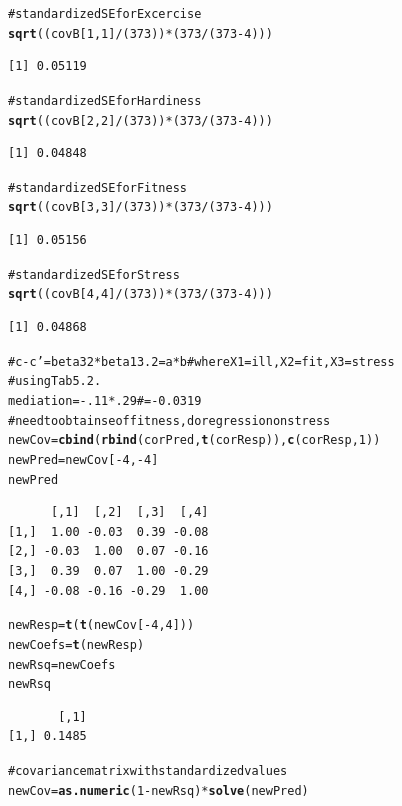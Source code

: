 \documentclass{article}\usepackage{graphicx, color}
\makeatletter
\newcommand{\hlfunctioncall}[1]{\textcolor[rgb]{0.501960784313725,0,0.329411764705882}{\textbf{#1}}}%
\newcommand{\hlcomment}[1]{\textcolor[rgb]{0.180392156862745,0.6,0.341176470588235}{#1}}%
\newenvironment{kframe}{%
 \def\at@end@of@kframe{}%
 \ifinner\ifhmode%
  \def\at@end@of@kframe{\end{minipage}}%
  \begin{minipage}{\columnwidth}%
 \fi\fi%
 \def\FrameCommand##1{\hskip\@totalleftmargin \hskip-\fboxsep
 \colorbox{shadecolor}{##1}\hskip-\fboxsep
     \hskip-\linewidth \hskip-\@totalleftmargin \hskip\columnwidth}%
 \MakeFramed {\advance\hsize-\width
   \@totalleftmargin\z@ \linewidth\hsize
   \@setminipage}}%
 {\par\unskip\endMakeFramed%
 \at@end@of@kframe}
\newenvironment{knitrout}{}{} %
\makeatother
\begin{document}
\begin{knitrout}
\begin{kframe}
\begin{alltt}
\hlcomment{# standardized SE for Excercise}
\hlfunctioncall{sqrt}((covB[1,1]/(373))*(373 / (373-4))) 
\end{alltt}
\begin{verbatim}
[1] 0.05119
\end{verbatim}
\begin{alltt}
\hlcomment{# standardized SE for Hardiness}
\hlfunctioncall{sqrt}((covB[2,2]/(373))*(373 / (373-4))) 
\end{alltt}
\begin{verbatim}
[1] 0.04848
\end{verbatim}
\begin{alltt}
\hlcomment{# standardized SE for Fitness}
\hlfunctioncall{sqrt}((covB[3,3]/(373))*(373 / (373-4))) 
\end{alltt}
\begin{verbatim}
[1] 0.05156
\end{verbatim}
\begin{alltt}
\hlcomment{# standardized SE for Stress}
\hlfunctioncall{sqrt}((covB[4,4]/(373))*(373 / (373-4))) 
\end{alltt}
\begin{verbatim}
[1] 0.04868
\end{verbatim}
\begin{alltt}

\hlcomment{# c-c' = beta32 * beta13.2 =a*b #where X1=ill,X2=fit,X3=stress}
\hlcomment{# using Tab 5.2.}
mediation=-.11*.29 \hlcomment{# = -0.0319}
\hlcomment{#need to obtain se of fitness, do regression on stress}
newCov=\hlfunctioncall{cbind}(\hlfunctioncall{rbind}(corPred,\hlfunctioncall{t}(corResp)),\hlfunctioncall{c}(corResp,1))
newPred=newCov[-4,-4]
newPred
\end{alltt}
\begin{verbatim}
      [,1]  [,2]  [,3]  [,4]
[1,]  1.00 -0.03  0.39 -0.08
[2,] -0.03  1.00  0.07 -0.16
[3,]  0.39  0.07  1.00 -0.29
[4,] -0.08 -0.16 -0.29  1.00
\end{verbatim}
\begin{alltt}
newResp=\hlfunctioncall{t}(\hlfunctioncall{t}(newCov[-4,4]))
newCoefs = \hlfunctioncall{t}(newResp)%
newRsq=newCoefs%
newRsq
\end{alltt}
\begin{verbatim}
       [,1]
[1,] 0.1485
\end{verbatim}
\begin{alltt}
\hlcomment{# covariance matrix with standardized values}
newCov = \hlfunctioncall{as.numeric}(1-newRsq)*\hlfunctioncall{solve}(newPred)


\end{alltt}
\end{kframe}
\end{knitrout}
\end{document}
